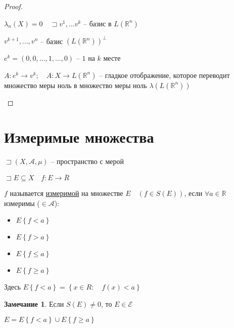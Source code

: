 \documentclass{book}
\newcommand\R{\ensuremath{\mathbb{R}}}
\theoremstyle{definition}
\newtheorem*{note}{Замечание}
\begin{document}
\begin{proof}
\begin{enumerate}
            $\lambda_n(X) = 0\quad \sqsupset v^1, \ldots v^k$ -- базис в $L\left( \R^n \right) $ 

            $v^{k+1}, \ldots, v^n$ -- базис $\left( L\left( \R^n \right)  \right) ^{\perp}$

            $e^k = \left( 0, 0, \ldots, 1, \ldots, 0 \right) $ -- $1$ на $k$  месте

            $A:e^k \to v^k;\quad A:X \to L\left( \R^n \right) $ -- гладкое отображение, которое переводит множество меры ноль в множество меры ноль $\lambda\left( L\left( \R^n \right)  \right) $

            
    \end{enumerate}
\end{proof}

\section{Измеримые множества}

$\sqsupset \left( X, \mathcal A, \mu \right) $ -- пространство с мерой
\begin{definition}
    
$\sqsupset E\subseteq X\quad f: E \to \overline R$

$f$ называется \underline{измеримой} на множестве  $E\quad \left( f\in S(E) \right) $, если $\forall a\in \R$ измеримы ($\in \mathcal A$):
\begin{itemize}
    \item $E\left\{ f< a \right\} $
    \item $E\left\{ f> a \right\} $
    \item $E\left\{ f\leqslant  a \right\} $
    \item $E\left\{ f\geqslant  a \right\} $
\end{itemize}

Здесь $E\left\{ f<a \right\}  = \left\{ x\in R:\quad f(x) < a \right\} $
\end{definition}

\begin{note}
    Если $S(E)\neq 0$, то $E\in \mathcal E$

    $E = E\left\{ f<a \right\} \cup E\left\{ f\geqslant a \right\} $
\end{note}
\end{document}
